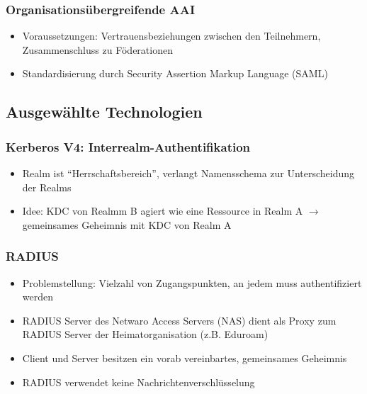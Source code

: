 \subsubsection{Organisationsübergreifende AAI}
\begin{itemize}
	\item Voraussetzungen: Vertrauensbeziehungen zwischen den Teilnehmern, Zusammenschluss zu Föderationen
	\item Standardisierung durch Security Assertion Markup Language (SAML)
\end{itemize}


\subsection{Ausgewählte Technologien}

\subsubsection{Kerberos V4: Interrealm-Authentifikation}
\begin{itemize}
	\item Realm ist "`Herrschaftsbereich"', verlangt Namensschema zur Unterscheidung der Realms
	\item Idee: KDC von Realmm B agiert wie eine Ressource in Realm A $\rightarrow$ gemeinsames Geheimnis mit KDC von Realm A
\end{itemize}

\subsubsection{RADIUS}
\begin{itemize}
	\item Problemstellung: Vielzahl von Zugangspunkten, an jedem muss authentifiziert werden
	\item RADIUS Server des Netwaro Access Servers (NAS) dient als Proxy zum RADIUS Server der Heimatorganisation (z.B. Eduroam)
	\item Client und Server besitzen ein vorab vereinbartes, gemeinsames Geheimnis
	\item RADIUS verwendet keine Nachrichtenverschlüsselung
\end{itemize}


